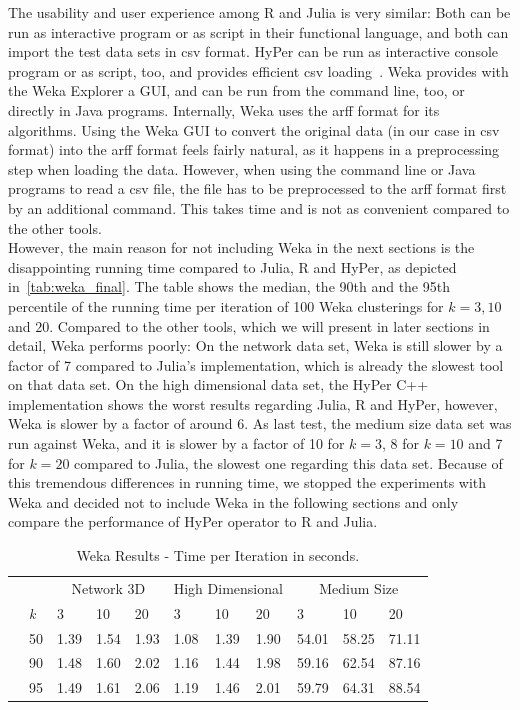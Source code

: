 The usability and user experience among R and Julia is very similar: Both can be run as interactive program or as script in their functional language, and both can import the test data sets in csv format. HyPer can be run as interactive console program or as script, too, and provides efficient csv loading~\parencite{hypercsv}. Weka provides with the Weka Explorer a GUI, and can be run from the command line, too, or directly in Java programs. Internally, Weka uses the arff format for its algorithms. Using the Weka GUI to convert the original data (in our case in csv format) into the arff format feels fairly natural, as it happens in a preprocessing step when loading the data. However, when using the command line or Java programs to read a csv file, the file has to be preprocessed to the arff format first by an additional command. This takes time and is not as convenient compared to the other tools.
\\
However, the main reason for not including Weka in the next sections is the disappointing running time compared to Julia, R and HyPer, as depicted in~\autoref{tab:weka_final}. The table shows the median, the 90th and the 95th percentile of the running time per iteration of 100 Weka clusterings for $k = 3, 10$ and $20$. Compared to the other tools, which we will present in later sections in detail, Weka performs poorly: On the network data set, Weka is still slower by a factor of 7 compared to Julia's implementation, which is already the slowest tool on that data set. On the high dimensional data set, the HyPer C++ implementation shows the worst results regarding Julia, R and HyPer, however, Weka is slower by a factor of around 6. As last test, the medium size data set was run against Weka, and it is slower by a factor of 10 for $k = 3$, 8 for $k = 10$ and 7 for $k = 20$ compared to Julia, the slowest one regarding this data set. Because of this tremendous differences in running time, we stopped the experiments with Weka and decided not to include Weka in the following sections and only compare the performance of HyPer operator to R and Julia.

\begin{table}[htsb]
  \caption[Weka Results - Time per Iteration]{Weka Results - Time per Iteration in seconds.}
  \label{tab:weka_final}
  \centering
  \begin{tabular}{ll l l l |l l l |l l l }
    \toprule
      &  & \multicolumn{3}{c}{Network 3D} & \multicolumn{3}{c}{High Dimensional} & \multicolumn{3}{c}{Medium Size}  \\
      & \emph{k} & 3 & 10 & 20 & 3 & 10 & 20 & 3 & 10 & 20 \\
    \midrule
      \parbox[t]{2mm}{} & 50  & 1.39 & 1.54 & 1.93 & 1.08 & 1.39 & 1.90 & 54.01 & 58.25 & 71.11 \\
      & 90  & 1.48 & 1.60 & 2.02 & 1.16 & 1.44 & 1.98 &59.16 & 62.54 & 87.16 \\
      & 95  & 1.49 & 1.61 & 2.06 & 1.19 & 1.46 & 2.01 & 59.79 & 64.31 & 88.54 \\
    \bottomrule
  \end{tabular}
\end{table}



